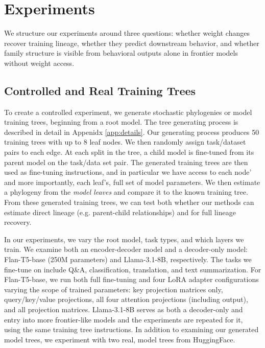 \documentclass{article}
\theoremstyle{definition}
\theoremstyle{plain}
\begin{document}
\section{Experiments}
\label{sec:experiments}
We structure our experiments around three questions: whether weight changes
recover training lineage, whether they predict downstream behavior, and
whether family structure is visible from behavioral outputs alone in
frontier models without weight access.

\subsection*{Controlled and Real Training Trees}
\label{sec:exp:trees}

To create a controlled experiment, we generate stochastic phylogenies or model training trees, beginning from a root model.  The tree generating process is described in detail in Appenidx \ref{app:details}.  Our generating process produces 50 training trees with up to 8 leaf nodes. We then randomly assign task/dataset pairs to each edge. At each split in the tree, a child model is fine-tuned from its parent model on the task/data set pair. The generated training trees are then used as fine-tuning instructions, and in particular we have access to each node' and more importantly, each leaf's,  full set of model parameters.  We then estimate a phylogeny from the \textit{model leaves} and compare it to the known training tree.  From these generated training trees, we can test both whether our methods can estimate direct lineage (e.g. parent-child relationships) and for full lineage recovery.

In our experiments, we vary the root model, task types, and which layers we train. We examine both an encoder-decoder model and a decoder-only model: Flan-T5-base (250M parameters) and Llama-3.1-8B, respectively. The tasks we fine-tune on include Q\&A, classification, translation, and text summarization. For Flan-T5-base, we run both full fine-tuning and four LoRA \citep{hu2022lora} adapter configurations varying the scope of trained parameters: key projection matrices only, query/key/value projections, all four attention projections (including output), and all projection matrices. Llama-3.1-8B serves as both a decoder-only and entry into more frontier-like models and the experiments are repeated for it, using the same training tree instructions. In addition to examining our generated model trees, we experiment with two real, model trees from HuggingFace.
\end{document}
